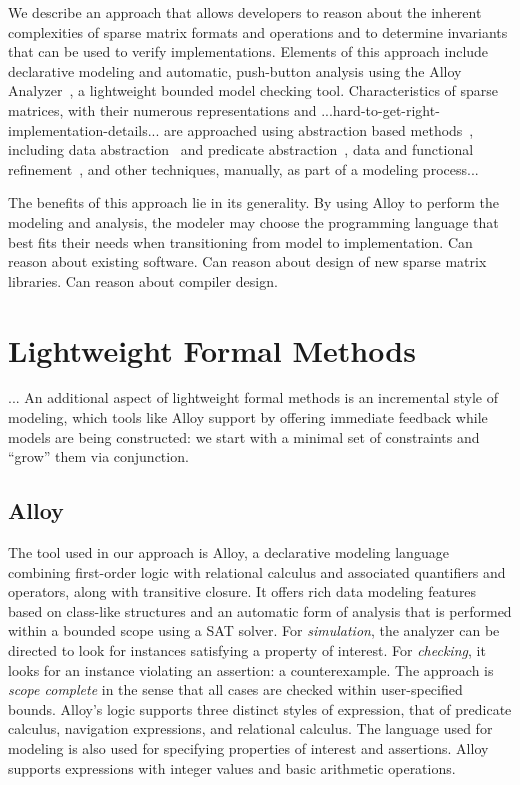 \documentclass[11pt,conference]{IEEEtran}
\begin{document}
We describe an approach that allows developers to reason about the inherent complexities of sparse matrix formats and operations and to determine invariants that can be used to verify implementations.
Elements of this approach include declarative modeling and automatic, push-button analysis using the Alloy Analyzer~\cite{jackson2012}, a lightweight bounded model checking tool.  Characteristics of sparse matrices, with their numerous representations and ...hard-to-get-right-implementation-details... are approached using abstraction based methods~\cite{clarke1994}, including data abstraction~\cite{dingel1995} and predicate abstraction~\cite{graf1997}, data and functional refinement~\cite{woodcock1996}, and other techniques, manually, as part of a modeling process...

The benefits of this approach lie in its generality.  By using Alloy to perform the modeling and analysis, the modeler may choose the programming language that best fits their needs when transitioning from model to implementation.
Can reason about existing software.
Can reason about design of new sparse matrix libraries.
Can reason about compiler design.

\section{Lightweight Formal Methods}

...
An additional aspect of lightweight formal methods is an incremental style of modeling, which tools like Alloy support by offering immediate feedback while models are being constructed: we start with a minimal set of constraints and ``grow'' them via conjunction.

\subsection{Alloy}

The tool used in our approach is Alloy, a declarative modeling language combining first-order logic with relational calculus and associated quantifiers and operators, along with transitive closure.  It offers rich data modeling features based on class-like structures and an automatic form of analysis that is performed within a bounded scope using a SAT solver.  For \emph{simulation}, the analyzer can be directed to look for instances satisfying a property of interest.  For \emph{checking}, it looks for an instance violating an assertion: a counterexample.  The approach is \emph{scope complete} in the sense that all cases are checked within user-specified bounds.  Alloy's logic supports three distinct styles of expression, that of predicate calculus, navigation expressions, and relational calculus.  The language used for modeling is also used for specifying properties of interest and assertions.  Alloy supports expressions with integer values and basic arithmetic operations.
\end{document}
